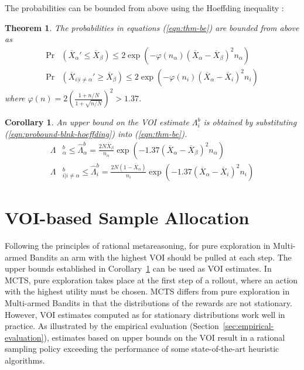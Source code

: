 \documentclass{ecai2012}
\newtheorem{thm}{Theorem}
\newtheorem{crl}{Corollary}
\begin{document}
The probabilities can be bounded from above using the
Hoeffding inequality \cite{Hoeffding.ineq}:
\begin{thm} The probabilities in equations (\ref{eqn:thm-be}) are bounded from above as
\begin{align}
  \label{eqn:probound-blnk-hoeffding}
  \Pr&(\overline X_\alpha' \le \overline X_\beta)
  \le 2\exp\left(- \varphi(n_\alpha)(\overline X_\alpha - \overline X_\beta)^2 n_\alpha
  \right)\nonumber\\
  \Pr&(\overline X_{i|i\ne\alpha}' \ge \overline X_\beta)
  \le 2\exp\left(- \varphi(n_i) (\overline X_\alpha -\overline  X_i)^2 n_i \right)
\end{align}
where $\varphi(n)=2(\frac {1+n/N} {1+\sqrt {n/N}})^2 > 1.37$.
\label{thm:hoeffding-prob-bounds}
\end{thm}
\begin{crl}
An upper bound on the VOI estimate $\Lambda_i^b$ is obtained
by substituting (\ref{eqn:probound-blnk-hoeffding}) into (\ref{eqn:thm-be}).
\begin{align}
  \label{eqn:bound-blnk-hoeffding}
  \Lambda&_\alpha^b \le \hat\Lambda_\alpha^b=\frac {2N\overline X_\beta} {n_\alpha}\exp\left(- 1.37(\overline X_\alpha - \overline X_\beta)^2 n_\alpha\right)\nonumber\\
  \Lambda&_{i|i\ne\alpha}^b\le \hat\Lambda_i^b=  \frac {2N(1-\overline  X_\alpha)} {n_i}\exp\left(- 1.37(\overline X_\alpha - \overline X_i)^2 n_i\right)
\end{align}
\label{crl:bound-blnk-hoeffding}
\end{crl}

\section{VOI-based Sample Allocation}

Following the principles of rational metareasoning, for pure
exploration in Multi-armed Bandits an arm with
the highest VOI should be pulled at each step. The upper bounds
established in Corollary~\ref{crl:bound-blnk-hoeffding} can be used
as VOI estimates. In MCTS, pure exploration takes place at the first
step of a rollout, where an action with the highest utility must
be chosen. MCTS differs from pure exploration in Multi-armed Bandits
in that the distributions of the rewards are not stationary. However,
VOI estimates computed as for stationary distributions work well in
practice. As illustrated by the empirical evaluation
(Section~\ref{sec:empirical-evaluation}), estimates based on upper
bounds on the VOI result in a rational sampling policy exceeding the
performance of some state-of-the-art heuristic algorithms.
\end{document}
